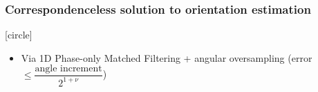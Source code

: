 \begin{frame}[noframenumbering]

  \frametitle{Correspondenceless solution to orientation estimation}


  \vspace{0.1cm}
  [circle]
  \begin{itemize}
    \item Via 1D Phase-only Matched Filtering + angular oversampling (error $\leq \dfrac{\text{angle increment}}{2^{1+\nu}}$)
  \end{itemize}
  \vspace{-0.25cm}

  \begin{center}
  \end{center}

\end{frame}
